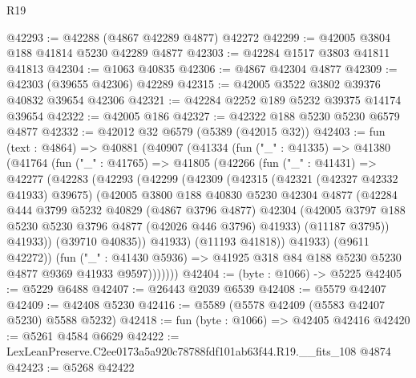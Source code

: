 \begin{lexlean}{R19}
\begin{coremodule}
@42293 := @42288 (@4867 @42289 @4877) @42272
@42299 := @42005 @3804 @188 @41814 @5230 @42289 @4877
@42303 := @42284 @1517 @3803 @41811 @41813
@42304 := @1063 @40835
@42306 := @4867 @42304 @4877
@42309 := @42303 (@39655 @42306) @42289
@42315 := @42005 @3522 @3802 @39376 @40832 @39654 @42306
@42321 := @42284 @2252 @189 @5232 @39375 @14174 @39654
@42322 := @42005 @186
@42327 := @42322 @188 @5230 @5230 @6579 @4877
@42332 := @42012 @32 @6579 (@5389 (@42015 @32))
@42403 := fun (text : @4864) =>
  @40881
    (@40907
      (@41334
        (fun ("_" : @41335) =>
        @41380
          (@41764
            (fun ("_" : @41765) =>
            @41805
              (@42266
                (fun ("_" : @41431) =>
                @42277
                  (@42283
                    (@42293
                      (@42299
                        (@42309
                          (@42315
                            (@42321 (@42327 @42332 @41933) @39675)
                            (@42005
                              @3800
                              @188
                              @40830
                              @5230
                              @42304
                              @4877
                              (@42284
                                @444
                                @3799
                                @5232
                                @40829
                                (@4867 @3796 @4877)
                                @42304
                                (@42005
                                  @3797
                                  @188
                                  @5230
                                  @5230
                                  @3796
                                  @4877
                                  (@42026 @446 @3796)
                                  @41933)
                                (@11187 @3795))
                              @41933))
                          (@39710 @40835))
                        @41933)
                      (@11193 @41818))
                    @41933)
                  (@9611 @42272))
                (fun ("_" : @41430 @5936) =>
                @41925 @318 @84 @188 @5230 @5230 @4877 @9369 @41933 @9597)))))))
@42404 := (byte : @1066) -> @5225
@42405 := @5229 @6488
@42407 := @26443 @2039 @6539
@42408 := @5579 @42407
@42409 := @42408 @5230
@42416 := @5589 (@5578 @42409 (@5583 @42407 @5230) @5588 @5232)
@42418 := fun (byte : @1066) => @42405 @42416
@42420 := @5261 @4584 @6629
@42422 := LexLeanPreserve.C2ee0173a5a920c78788fdf101ab63f44.R19.__fits_108 @4874
@42423 := @5268 @42422

\end{coremodule}
\end{lexlean}
